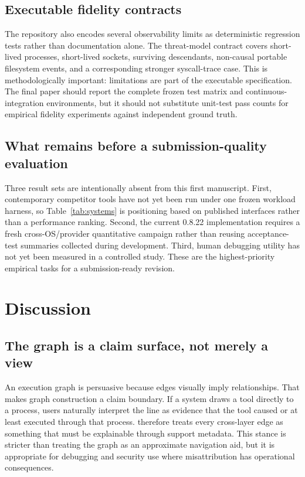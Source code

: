 \subsection{Executable fidelity contracts}
The repository also encodes several observability limits as deterministic regression tests rather than documentation alone. The threat-model contract covers short-lived processes, short-lived sockets, surviving descendants, non-causal portable filesystem events, and a corresponding stronger syscall-trace case. This is methodologically important: limitations are part of the executable specification. The final paper should report the complete frozen test matrix and continuous-integration environments, but it should not substitute unit-test pass counts for empirical fidelity experiments against independent ground truth.

\subsection{What remains before a submission-quality evaluation}
Three result sets are intentionally absent from this first manuscript. First, contemporary competitor tools have not yet been run under one frozen workload harness, so Table~\ref{tab:systems} is positioning based on published interfaces rather than a performance ranking. Second, the current 0.8.22 implementation requires a fresh cross-OS/provider quantitative campaign rather than reusing acceptance-test summaries collected during development. Third, human debugging utility has not yet been measured in a controlled study. These are the highest-priority empirical tasks for a submission-ready revision.

\section{Discussion}
\subsection{The graph is a claim surface, not merely a view}
An execution graph is persuasive because edges visually imply relationships. That makes graph construction a claim boundary. If a system draws a tool directly to a process, users naturally interpret the line as evidence that the tool caused or at least executed through that process. \system therefore treats every cross-layer edge as something that must be explainable through support metadata. This stance is stricter than treating the graph as an approximate navigation aid, but it is appropriate for debugging and security use where misattribution has operational consequences.

